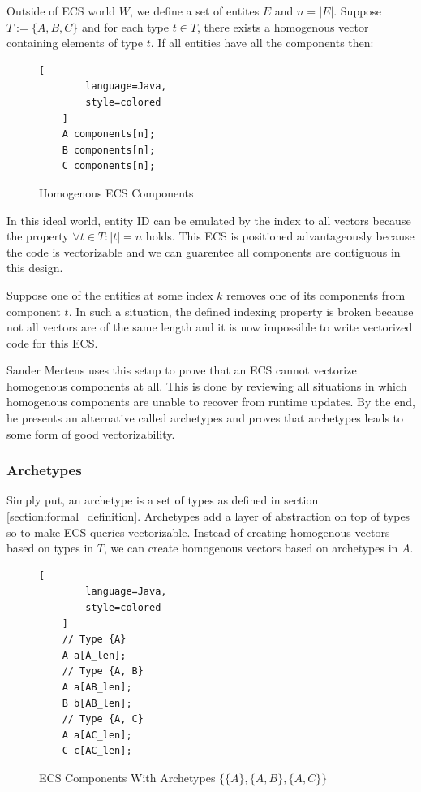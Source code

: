 Outside of ECS world $W$, we define a set of entites $E$ and $n = |E|$. Suppose $T := \{A,B,C\}$ and for each type $t \in T$, there exists a homogenous vector containing elements of type $t$. If all entities have all the components then:

\begin{figure}[H]
    \begin{lstlisting}[
        language=Java,
        style=colored
    ]
    A components[n];
    B components[n];
    C components[n];
    \end{lstlisting}
    \caption{Homogenous ECS Components}
    \label{code:homogenous_ecs}
\end{figure}

In this ideal world, entity ID can be emulated by the index to all vectors because the property $\forall t \in T : |t| = n$ holds. This ECS is positioned advantageously because the code is vectorizable and we can guarentee all components are contiguous in this design. 

Suppose one of the entities at some index $k$ removes one of its components from component $t$. In such a situation, the defined indexing property is broken because not all vectors are of the same length and it is now impossible to write vectorized code for this ECS.

Sander Mertens uses this setup to prove that an ECS cannot vectorize homogenous components at all. This is done by reviewing all situations in which homogenous components are unable to recover from runtime updates. By the end, he presents an alternative called archetypes and proves that archetypes leads to some form of good vectorizability.

\subsubsection{Archetypes}
Simply put, an archetype is a set of types as defined in section \ref{section:formal_definition}. Archetypes add a layer of abstraction on top of types so to make ECS queries vectorizable. Instead of creating homogenous vectors based on types in $T$, we can create homogenous vectors based on archetypes in $A$. 

\begin{figure}[H]
    \begin{lstlisting}[
        language=Java,
        style=colored
    ]
    // Type {A}
    A a[A_len];
    // Type {A, B}
    A a[AB_len];
    B b[AB_len];
    // Type {A, C}
    A a[AC_len];
    C c[AC_len];
    \end{lstlisting}
    \caption{ECS Components With Archetypes $\{\{A\},\{A,B\},\{A,C\}\}$}
    \label{code:ecs_archetypes}
\end{figure}

